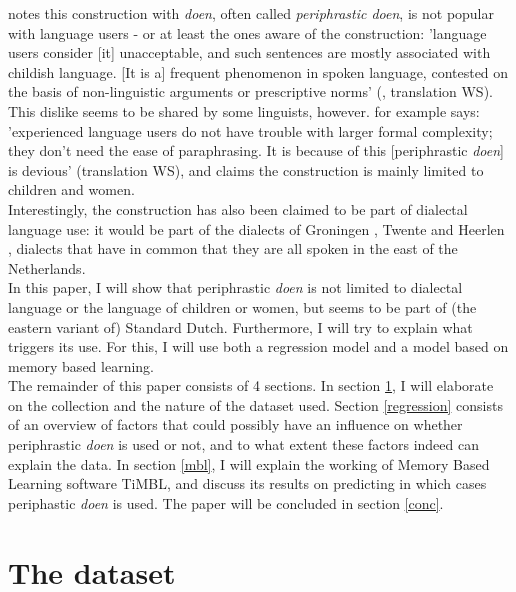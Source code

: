 \documentclass[12pt]{article}
\begin{document}
\citet{g83} notes this construction with \emph{doen}, often called \emph{periphrastic doen}, is not popular with language users - or at least the ones aware of the construction: 'language users consider [it] unacceptable, and such sentences are mostly associated with childish language. [It is a] frequent phenomenon in spoken language, contested on the basis of non-linguistic arguments or prescriptive norms' (\citealp[p. 58]{g83}, translation WS).\\\indent
This dislike seems to be shared by some linguists, however. \citet[p. 121]{d94} for example says: 'experienced language users do not have trouble with larger formal complexity; they don't need the ease of paraphrasing. It is because of this [periphrastic \emph{doen}] is devious' (translation WS), and \citet[p. 153]{n62} claims the construction is mainly limited to children and women.\\\indent
Interestingly, the construction has also been claimed to be part of dialectal language use: it would be part of the dialects of Groningen \citep{tl53}, Twente \citep{n62} and Heerlen \citep{c94}, dialects that have in common that they are all spoken in the east of the Netherlands.\\\indent
In this paper, I will show that periphrastic \emph{doen} is not limited to dialectal language or the language of children or women,  but seems to be part of (the eastern variant of) Standard Dutch. Furthermore, I will try to explain what triggers its use. For this, I will use both a regression model and a model based on memory based learning.\\\indent
The remainder of this paper consists of 4 sections. In section \ref{data}, I will elaborate on the collection and the nature of the dataset used. Section \ref{regression} consists of an overview of factors that could possibly have an influence on whether periphrastic \emph{doen} is used or not, and to what extent these factors indeed can explain the data. In section \ref{mbl}, I will explain the working of Memory Based Learning software TiMBL, and discuss its results on predicting in which cases periphastic \emph{doen} is used. The paper will be concluded in section \ref{conc}.




\section{The dataset} \label{data}
\end{document}
